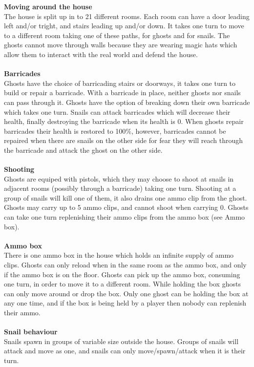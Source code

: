 \documentclass{article}
\begin{document}
\textbf{Moving around the house} \\ 
The house is split up in to 21 different rooms. Each room can have a door leading left and/or tright, and stairs leading up and/or down. It takes one turn to move to a different room taking one of these paths, for ghosts and for snails. The ghosts cannot move through walls because they are wearing magic hats which allow them to interact with the real world and defend the house.\\ \\
\textbf{Barricades} \\
Ghosts have the choice of barricading stairs or doorways, it takes one turn to build or repair a barricade. With a barricade in place, neither ghosts nor snails can pass through it. Ghosts have the option of breaking down their own barricade which takes one turn. Snails can attack barricades which will decrease their health, finally destroying the barricade when its health is 0. When ghosts repair barricades their health is restored to 100\%, however, barricades cannot be repaired when there are snails on the other side for fear they will reach through the barricade and attack the ghost on the other side. \\ \\
\textbf{Shooting} \\
Ghosts are equiped with pistols, which they may choose to shoot at snails in adjacent rooms (possibly through a barricade) taking one turn. Shooting at a group of snails will kill one of them, it also drains one ammo clip from the ghost. Ghosts may carry up to 5 ammo clips, and cannot shoot when carrying 0. Ghosts can take one turn replenishing their ammo clips from the ammo box (see Ammo box). \\ \\

\textbf{Ammo box} \\
There is one ammo box in the house which holds an infinite supply of ammo clips. Ghosts can only reload when in the same room as the ammo box, and only if the ammo box is on the floor. Ghosts can pick up the ammo box, consuming one turn, in order to move it to a different room. While holding the box ghosts can only move around or drop the box. Only one ghost can be holding the box at any one time, and if the box is being held by a player then nobody can replenish their ammo. \\ \\

\textbf{Snail behaviour} \\
Snails spawn in groups of variable size outside the house. Groups of snails will attack and move as one, and snails can only move/spawn/attack when it is their turn.
\end{document}
